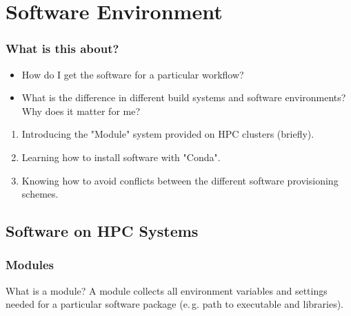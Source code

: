 \section{Software Environment}
{   
}

\begin{frame}
	\frametitle{What is this about?}
	\begin{question}[Questions]\begin{itemize}
			\item How do I get the software for a particular workflow?
			\item What is the difference in different build systems and software environments? Why does it matter for me?
		\end{itemize}
	\end{question}
	\begin{docs}[Objectives]
	  \begin{enumerate}
			\item Introducing the "Module" system provided on HPC clusters (briefly).
			\item Learning how to install software with "Conda".
			\item Knowing how to avoid conflicts between the different software provisioning schemes.
	  \end{enumerate}
    \end{docs}
\end{frame}

\subsection{Software on HPC Systems}

\begin{frame}
  \frametitle{Modules}
  \vspace{-1.3em}
  \begin{block}{What is a module?}
    A module collects all environment variables and settings needed for a particular software package (e.\,g. path to executable and libraries).
  \end{block}

  \vfill
\end{frame}

